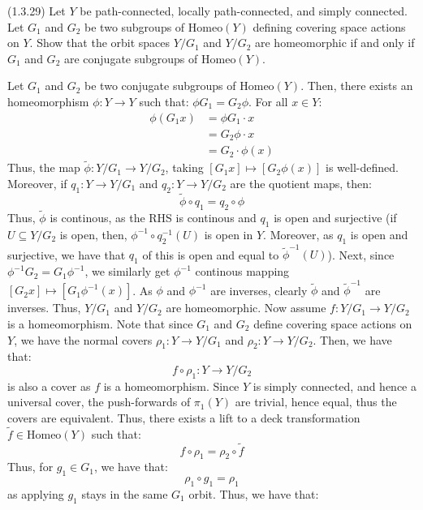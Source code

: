 \documentclass[12pt]{article}
\begin{document}
\begin{problem}{3}
    (1.3.29) Let $Y$ be path-connected, locally path-connected, and simply connected. Let $G_1$ and $G_2$ be two subgroups of $\mathrm{Homeo}(Y)$ defining covering space actions on $Y$. Show that the orbit spaces $Y/G_1$ and $Y/G_2$ are homeomorphic if and only if $G_1$ and $G_2$ are conjugate subgroups of $\mathrm{Homeo}(Y)$. 
\end{problem}

\begin{solution}
    Let $G_1$ and $G_2$ be two conjugate subgroups of $\mathrm{Homeo}(Y)$. Then, there exists an homeomorphism $\phi: Y \to Y$ such that: $\phi G_1 = G_2\phi$. For all $x \in Y$:
    \begin{align*}
        \phi(G_1 x) &= \phi G_1 \cdot x \\ 
        &= G_2 \phi \cdot x \\
        &= G_2 \cdot \phi(x)
    \end{align*} 
    Thus, the map $\tilde\phi: Y/G_1 \to Y/G_2$, taking $[G_1 x] \mapsto [G_2 \phi(x)]$ is well-defined. Moreover, if $q_1: Y \to Y/G_1$ and $q_2: Y \to Y/G_2$ are the quotient maps, then:
    \[ \tilde \phi \circ q_1 = q_2 \circ \phi\]
    Thus, $\tilde \phi$ is continous, as the RHS is continous and $q_1$ is open and surjective (if $U \subseteq Y/G_2$ is open, then, $\phi^{-1} \circ q_2^{-1}(U)$ is open in $Y$. Moreover, as $q_1$ is open and surjective, we have that $q_1$ of this is open and equal to $\tilde\phi^{-1}(U)$). \bbni
    Next, since $\phi^{-1}G_2 = G_1\phi^{-1}$, we similarly get $\phi^{-1}$ continous mapping $[G_2 x] \mapsto [G_1 \phi^{-1}(x)]$. As $\phi$ and $\phi^{-1}$ are inverses, clearly $\tilde \phi$ and $\tilde \phi^{-1}$ are inverses. Thus, $Y/G_1$ and $Y/G_2$ are homeomorphic. \bbni
    Now assume $f: Y/G_1 \to Y/G_2$ is a homeomorphism. Note that since $G_1$ and $G_2$ define covering space actions on $Y$, we have the normal covers $\rho_1: Y \to Y/G_1$ and $\rho_2: Y \to Y/G_2$. Then, we have that: 
    \[ f \circ \rho_1: Y \to Y/G_2\]
    is also a cover as $f$ is a homeomorphism. Since $Y$ is simply connected, and hence a universal cover, the push-forwards of $\pi_1(Y)$ are trivial, hence equal, thus the covers are equivalent. Thus, there exists a lift to a deck transformation $\tilde f \in \mathrm{Homeo}(Y)$ such that: 
    \[ f \circ \rho_1 = \rho_2 \circ \tilde f\]
    Thus, for $g_1 \in G_1$, we have that: 
    \[\rho_1  \circ g_1 = \rho_1\]
    as applying $g_1$ stays in the same $G_1$ orbit. Thus, we have that: 
    \begin{align*}

\end{align*}
\end{solution}
\end{document}
